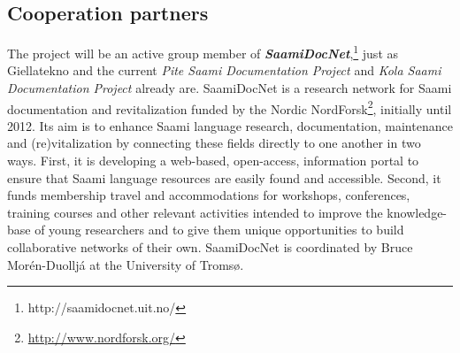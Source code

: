 \documentclass[a4paper,12pt]{article}
\begin{document}
\subsection{Cooperation partners}\label{coop}
The project will be an active group member of \textit{\textbf{SaamiDocNet}},\footnote{http://saamidocnet.uit.no/} just as Giellatekno and the current {\it Pite Saami Documentation Project} and {\it Kola Saami Documentation Project} already are. SaamiDocNet is a research network for Saami documentation and revitalization funded by the Nordic NordForsk\footnote{\url{http://www.nordforsk.org/}}, initially until 2012. Its aim is to enhance Saami language research, documentation, maintenance and (re)vitalization by connecting these fields directly to one another in two ways. First, it is developing a web-based, open-access, information portal to ensure that Saami language resources are easily found and accessible. Second, it funds membership travel and accommodations for workshops, conferences, training courses and other relevant activities intended to improve the knowledge-base of young researchers and to give them unique opportunities to build collaborative networks of their own. SaamiDocNet is coordinated by Bruce Morén-Duolljá at the University of Tromsø.
\end{document}
